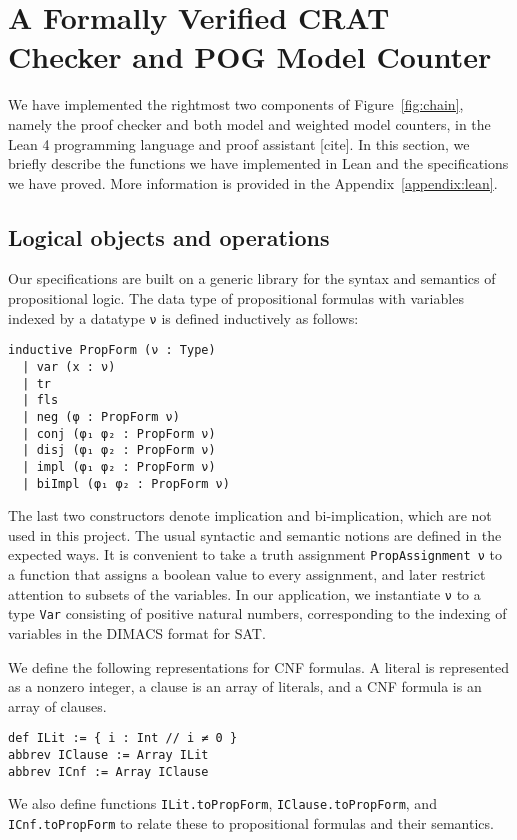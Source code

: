 \section{A Formally Verified CRAT Checker and POG Model Counter}

We have implemented the rightmost two components of Figure~\ref{fig:chain}, namely the
proof checker and both model and weighted model counters, in the Lean 4 programming language
and proof assistant [cite].
In this section, we briefly describe the functions we have implemented in Lean and
the specifications we have proved.
More information is provided in the Appendix~\ref{appendix:lean}.

\subsection{Logical objects and operations}

Our specifications are built on a generic library for the syntax and semantics of
propositional logic. The data type of propositional formulas with variables indexed by
a datatype \lstinline{ν} is defined inductively as follows:
\begin{lstlisting}
inductive PropForm (ν : Type)
  | var (x : ν)
  | tr
  | fls
  | neg (φ : PropForm ν)
  | conj (φ₁ φ₂ : PropForm ν)
  | disj (φ₁ φ₂ : PropForm ν)
  | impl (φ₁ φ₂ : PropForm ν)
  | biImpl (φ₁ φ₂ : PropForm ν)
\end{lstlisting}
The last two constructors denote implication and bi-implication, which are not used in this
project. The usual syntactic and semantic notions are defined in the expected ways.
It is convenient to take a truth assignment \lstinline{PropAssignment ν} to a function that
assigns a boolean value to every assignment, and later restrict attention to subsets of the
variables. In our application, we instantiate \lstinline{ν} to a type \lstinline{Var} consisting
of positive natural numbers, corresponding to the indexing of variables in the DIMACS
format for SAT.

We define the following representations for CNF formulas.
A literal is represented as a nonzero integer, a clause is an array of literals,
and a CNF formula is an array of clauses.
\begin{lstlisting}
def ILit := { i : Int // i ≠ 0 }
abbrev IClause := Array ILit
abbrev ICnf := Array IClause
\end{lstlisting}
We also define functions \lstinline{ILit.toPropForm}, \lstinline{IClause.toPropForm},
and \lstinline{ICnf.toPropForm} to relate these to propositional formulas and their
semantics.


